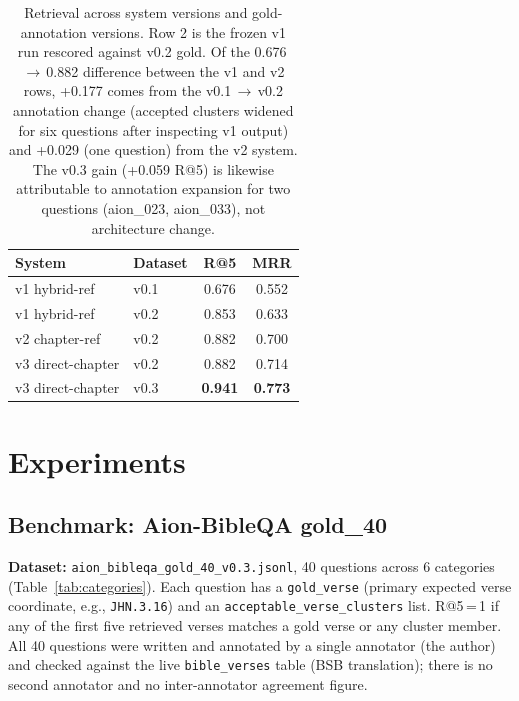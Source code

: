 \documentclass[11pt]{article}
\begin{document}
\begin{table}[t]
  \centering
  \small
  \begin{tabular}{llcc}
    \toprule
    \textbf{System} & \textbf{Dataset} & \textbf{R@5} & \textbf{MRR} \\
    \midrule
    v1 hybrid-ref     & v0.1 & 0.676 & 0.552 \\
    v1 hybrid-ref     & v0.2 & 0.853 & 0.633 \\
    v2 chapter-ref    & v0.2 & 0.882 & 0.700 \\
    v3 direct-chapter & v0.2 & 0.882 & 0.714 \\
    v3 direct-chapter & v0.3 & \textbf{0.941} & \textbf{0.773} \\
    \bottomrule
  \end{tabular}
  \caption{Retrieval across system versions and gold-annotation versions. Row 2 is the frozen v1 run rescored against v0.2 gold. Of the 0.676\,$\rightarrow$\,0.882 difference between the v1 and v2 rows, +0.177 comes from the v0.1\,$\rightarrow$\,v0.2 annotation change (accepted clusters widened for six questions after inspecting v1 output) and +0.029 (one question) from the v2 system. The v0.3 gain (+0.059 R@5) is likewise attributable to annotation expansion for two questions (aion\_023, aion\_033), not architecture change.}
  \label{tab:versions}
\end{table}

\section{Experiments}

\subsection{Benchmark: Aion-BibleQA gold\_40}

\textbf{Dataset:} \texttt{aion\_bibleqa\_gold\_40\_v0.3.jsonl}, 40 questions across 6 categories (Table~\ref{tab:categories}).
Each question has a \texttt{gold\_verse} (primary expected verse coordinate, e.g., \texttt{JHN.3.16}) and an \texttt{acceptable\_verse\_clusters} list.
R@5\,=\,1 if any of the first five retrieved verses matches a gold verse or any cluster member.
All 40 questions were written and annotated by a single annotator (the author) and checked against the live \texttt{bible\_verses} table (BSB translation); there is no second annotator and no inter-annotator agreement figure.
\end{document}
